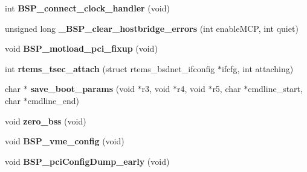 \begin{DoxyCompactItemize}
\mbox{\label{group__RTEMSBSPsPowerPCMVME3100_ga7e99fec6e3bd9986094a2de9cc0b110a}} 
int {\bfseries B\+S\+P\+\_\+connect\+\_\+clock\+\_\+handler} (void)
\item 
\mbox{\label{group__RTEMSBSPsPowerPCMVME3100_ga9365175934c534169a41c05950c05fcd}} 
unsigned long {\bfseries \+\_\+\+B\+S\+P\+\_\+clear\+\_\+hostbridge\+\_\+errors} (int enable\+M\+CP, int quiet)
\item 
\mbox{\label{group__RTEMSBSPsPowerPCMVME3100_ga8753dd0fb905f41f37c5d87c7a26c7e2}} 
void {\bfseries B\+S\+P\+\_\+motload\+\_\+pci\+\_\+fixup} (void)
\item 
\mbox{\label{group__RTEMSBSPsPowerPCMVME3100_ga50603e67c255f617b9579af99cd84ce3}} 
int {\bfseries rtems\+\_\+tsec\+\_\+attach} (struct rtems\+\_\+bsdnet\+\_\+ifconfig $\ast$ifcfg, int attaching)
\item 
\mbox{\label{group__RTEMSBSPsPowerPCMVME3100_ga127266abfcf87d5e48d649092e2951e9}} 
char $\ast$ {\bfseries save\+\_\+boot\+\_\+params} (void $\ast$r3, void $\ast$r4, void $\ast$r5, char $\ast$cmdline\+\_\+start, char $\ast$cmdline\+\_\+end)
\item 
\mbox{\label{group__RTEMSBSPsPowerPCMVME3100_gaa1c249f197a325121cc9678b1665c29b}} 
void {\bfseries zero\+\_\+bss} (void)
\item 
\mbox{\label{group__RTEMSBSPsPowerPCMVME3100_gae816799ec203a897bdb1e1b0ff92d433}} 
void {\bfseries B\+S\+P\+\_\+vme\+\_\+config} (void)
\item 
\mbox{\label{group__RTEMSBSPsPowerPCMVME3100_gadc6403b8ac3a64d29c653ef44bab6425}} 
void {\bfseries B\+S\+P\+\_\+pci\+Config\+Dump\+\_\+early} (void)
\end{DoxyCompactItemize}
